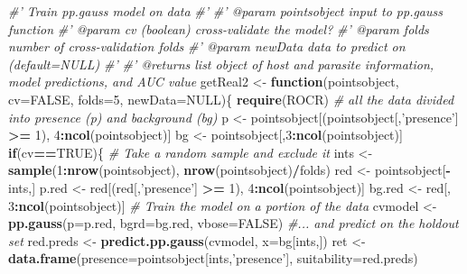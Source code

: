 \documentclass[
]{article}
\newenvironment{Shaded}{\begin{snugshade}}{\end{snugshade}}
\newcommand{\CommentTok}[1]{\textcolor[rgb]{0.56,0.35,0.01}{\textit{#1}}}
\newcommand{\ControlFlowTok}[1]{\textcolor[rgb]{0.13,0.29,0.53}{\textbf{#1}}}
\newcommand{\DataTypeTok}[1]{\textcolor[rgb]{0.13,0.29,0.53}{#1}}
\newcommand{\DecValTok}[1]{\textcolor[rgb]{0.00,0.00,0.81}{#1}}
\newcommand{\KeywordTok}[1]{\textcolor[rgb]{0.13,0.29,0.53}{\textbf{#1}}}
\newcommand{\NormalTok}[1]{#1}
\newcommand{\OperatorTok}[1]{\textcolor[rgb]{0.81,0.36,0.00}{\textbf{#1}}}
\newcommand{\OtherTok}[1]{\textcolor[rgb]{0.56,0.35,0.01}{#1}}
\newcommand{\StringTok}[1]{\textcolor[rgb]{0.31,0.60,0.02}{#1}}
\begin{document}
\begin{Shaded}
\begin{Highlighting}[]
\CommentTok{#' Train pp.gauss model on data}
\CommentTok{#'}
\CommentTok{#' @param pointsobject input to pp.gauss function}
\CommentTok{#' @param cv (boolean) cross-validate the model?}
\CommentTok{#' @param folds number of cross-validation folds}
\CommentTok{#' @param newData data to predict on (default=NULL)}
\CommentTok{#' }
\CommentTok{#' @returns list object of host and parasite information, model predictions, and AUC value}
\NormalTok{getReal2 <-}\StringTok{ }\ControlFlowTok{function}\NormalTok{(pointsobject, }\DataTypeTok{cv=}\OtherTok{FALSE}\NormalTok{, }\DataTypeTok{folds=}\DecValTok{5}\NormalTok{, }\DataTypeTok{newData=}\OtherTok{NULL}\NormalTok{)\{}
  \KeywordTok{require}\NormalTok{(ROCR)}
  \CommentTok{# all the data divided into presence (p) and background (bg)}
\NormalTok{  p <-}\StringTok{ }\NormalTok{pointsobject[(pointsobject[,}\StringTok{'presence'}\NormalTok{] }\OperatorTok{>=}\StringTok{ }\DecValTok{1}\NormalTok{), }\DecValTok{4}\OperatorTok{:}\KeywordTok{ncol}\NormalTok{(pointsobject)]}
\NormalTok{  bg <-}\StringTok{ }\NormalTok{pointsobject[,}\DecValTok{3}\OperatorTok{:}\KeywordTok{ncol}\NormalTok{(pointsobject)]}
  \ControlFlowTok{if}\NormalTok{(cv}\OperatorTok{==}\OtherTok{TRUE}\NormalTok{)\{}
        \CommentTok{# Take a random sample and exclude it}
\NormalTok{        ints <-}\StringTok{ }\KeywordTok{sample}\NormalTok{(}\DecValTok{1}\OperatorTok{:}\KeywordTok{nrow}\NormalTok{(pointsobject), }\KeywordTok{nrow}\NormalTok{(pointsobject)}\OperatorTok{/}\NormalTok{folds)}
\NormalTok{        red <-}\StringTok{ }\NormalTok{pointsobject[}\OperatorTok{-}\NormalTok{ints,]}
\NormalTok{        p.red <-}\StringTok{ }\NormalTok{red[(red[,}\StringTok{'presence'}\NormalTok{] }\OperatorTok{>=}\StringTok{ }\DecValTok{1}\NormalTok{), }\DecValTok{4}\OperatorTok{:}\KeywordTok{ncol}\NormalTok{(pointsobject)]}
\NormalTok{        bg.red <-}\StringTok{ }\NormalTok{red[, }\DecValTok{3}\OperatorTok{:}\KeywordTok{ncol}\NormalTok{(pointsobject)]}
        \CommentTok{# Train the model on a portion of the data}
\NormalTok{        cvmodel <-}\StringTok{ }\KeywordTok{pp.gauss}\NormalTok{(}\DataTypeTok{p=}\NormalTok{p.red, }\DataTypeTok{bgrd=}\NormalTok{bg.red, }\DataTypeTok{vbose=}\OtherTok{FALSE}\NormalTok{)}
        \CommentTok{#... and predict on the holdout set}
\NormalTok{        red.preds <-}\StringTok{ }\KeywordTok{predict.pp.gauss}\NormalTok{(cvmodel, }\DataTypeTok{x=}\NormalTok{bg[ints,])}
\NormalTok{        ret <-}\StringTok{ }\KeywordTok{data.frame}\NormalTok{(}\DataTypeTok{presence=}\NormalTok{pointsobject[ints,}\StringTok{'presence'}\NormalTok{], }\DataTypeTok{suitability=}\NormalTok{red.preds)}

\end{Highlighting}
\end{Shaded}
\end{document}
